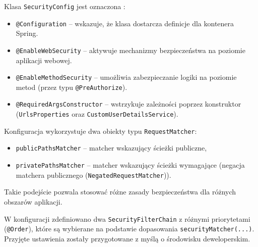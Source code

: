 
Klasa \texttt{SecurityConfig} jest oznaczona :
\begin{itemize}
    \item \texttt{@Configuration} -- wskazuje, że klasa dostarcza definicje  dla kontenera Spring.
    \item \texttt{@EnableWebSecurity} -- aktywuje mechanizmy bezpieczeństwa na poziomie aplikacji webowej.
    \item \texttt{@EnableMethodSecurity} -- umożliwia zabezpieczanie logiki na poziomie metod
    (przez  typu \texttt{@PreAuthorize}).
    \item \texttt{@RequiredArgsConstructor} -- wstrzykuje zależności poprzez konstruktor
    \newline (\texttt{UrlsProperties} oraz \texttt{CustomUserDetailsService}).
\end{itemize}


Konfiguracja wykorzystuje dwa obiekty typu \texttt{RequestMatcher}:
\begin{itemize}
    \item \texttt{publicPathsMatcher} -- matcher wskazujący ścieżki publiczne,
    \item \texttt{privatePathsMatcher} -- matcher wskazujący ścieżki wymagające 
    (negacja matchera publicznego (\texttt{NegatedRequestMatcher})).
\end{itemize}

Takie podejście pozwala stosować różne zasady bezpieczeństwa dla różnych obszarów aplikacji.


W konfiguracji zdefiniowano dwa \texttt{SecurityFilterChain} z różnymi priorytetami (\texttt{@Order}),
które są wybierane na podstawie dopasowania \texttt{securityMatcher(...)}.
Przyjęte ustawienia zostały przygotowane z myślą o środowisku deweloperskim.

